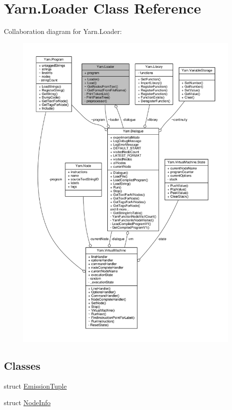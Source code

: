\hypertarget{a00135}{\section{Yarn.\-Loader Class Reference}
\label{a00135}
}


Collaboration diagram for Yarn.\-Loader\-:
\nopagebreak
\begin{figure}[H]
\begin{center}
\leavevmode
\includegraphics[width=350pt]{a00662}
\end{center}
\end{figure}
\subsection*{Classes}
\begin{DoxyCompactItemize}
\item 
struct \hyperlink{a00099}{Emission\-Tuple}
\item 
struct \hyperlink{a00142}{Node\-Info}
\end{DoxyCompactItemize}
